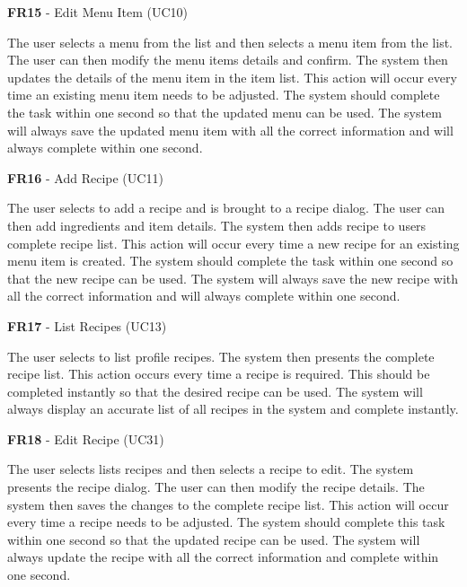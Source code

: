 \noindent \textbf{FR15} - Edit Menu Item (UC10)\\
\begin{small}
	The user selects a menu from the list and then selects a menu item from the list. The user can then modify the menu items details and confirm. The system then updates the details of the menu item in the item list. This action will occur every time an existing menu item needs to be adjusted. The system should complete the task within one second so that the updated menu can be used. The system will always save the updated menu item with all the correct information and will always complete within one second.\\
\end{small}
\linebreak

\pagebreak

\noindent \textbf{FR16} - Add Recipe (UC11)\\
\begin{small}
	The user selects to add a recipe and is brought to a recipe dialog. The user can then add ingredients and item details. The system then adds recipe to users complete recipe list. This action will occur every time a new recipe for an existing menu item is created. The system should complete the task within one second so that the new recipe can be used. The system will always save the new recipe with all the correct information and will always complete within one second.\\
\end{small}
\linebreak

\noindent \textbf{FR17} - List Recipes (UC13)\\
\begin{small}
	The user selects to list profile recipes. The system then presents the complete recipe list. This action occurs every time a recipe is required. This should be completed instantly so that the desired recipe can be used. The system will always display an accurate list of all recipes in the system and complete instantly.\\
\end{small}
\linebreak

\noindent \textbf{FR18} - Edit Recipe (UC31)\\
\begin{small}
	The user selects lists recipes and then selects a recipe to edit. The system presents the recipe dialog. The user can then modify the recipe details. The system then saves the changes to the complete recipe list. This action will occur every time a recipe needs to be adjusted. The system should complete this task within one second so that the updated recipe can be used. The system will always update the recipe with all the correct information and complete within one second.\\
\end{small}
\linebreak



